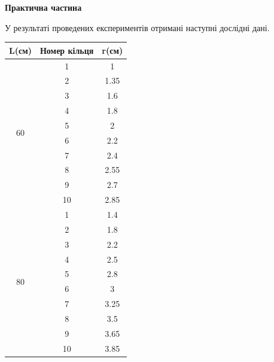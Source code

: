 \begin{center}
    \Large{\textbf{Практична частина}}
\end{center}

\vspace{1mm}

У результаті проведених експериментів отримані наступні дослідні дані.
\begin{table}[h]
    \centering
    \begin{tabular}{|c|c|c|}
        \hline
        \textbf{L(см)} & \textbf{Номер кільця} & \textbf{r(см)} \\
        \hline

        \multirow{10}{*}{60} & 1 & 1 \\
        \cline{2-3}
        & 2 & 1.35 \\
        \cline{2-3}
        & 3 & 1.6 \\        
        \cline{2-3}
        & 4 & 1.8 \\
        \cline{2-3}
        & 5 & 2 \\        
        \cline{2-3}
        & 6 & 2.2  \\
        \cline{2-3}
        & 7 & 2.4  \\
        \cline{2-3}        
        & 8 & 2.55  \\
        \cline{2-3}
        & 9 & 2.7  \\
        \cline{2-3}        
        & 10 & 2.85  \\
        \hline
        
        \multirow{10}{*}{80} & 1 & 1.4  \\
        \cline{2-3}
        & 2 & 1.8 \\
        \cline{2-3}
        & 3 & 2.2 \\        
        \cline{2-3}
        & 4 & 2.5 \\
        \cline{2-3}
        & 5 & 2.8 \\        
        \cline{2-3}
        & 6 & 3 \\
        \cline{2-3}
        & 7 & 3.25 \\
        \cline{2-3}        
        & 8 & 3.5 \\
        \cline{2-3}
        & 9 & 3.65 \\
        \cline{2-3}        
        & 10 & 3.85 \\
        \hline


\end{tabular}
\end{table}
